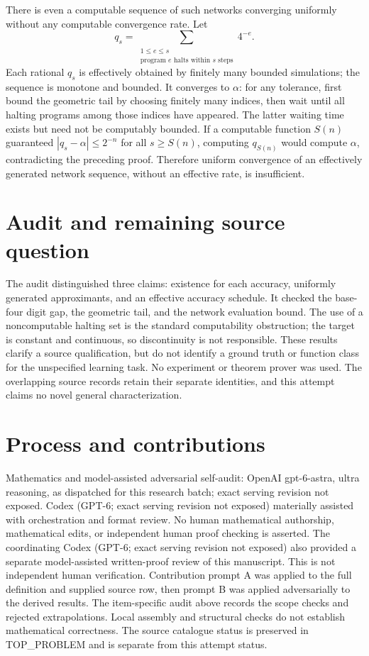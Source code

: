 \documentclass[11pt]{article}
\begin{document}
There is even a computable sequence of such networks converging
uniformly without any computable convergence rate. Let
\[
 q_s=\sum_{\substack{1\le e\le s\\
                 \text{program }e\text{ halts within }s\text{ steps}}}4^{-e}.
\]
Each rational $q_s$ is effectively obtained by finitely many
bounded simulations; the sequence is monotone and bounded.
It converges to $\alpha$: for any tolerance, first bound the
geometric tail by choosing finitely many indices, then wait
until all halting programs among those indices have appeared.
The latter waiting time exists but need not be computably
bounded. If a computable function $S(n)$ guaranteed
$|q_s-\alpha|\le2^{-n}$ for all $s\ge S(n)$, computing
$q_{S(n)}$ would compute $\alpha$, contradicting the preceding
proof. Therefore uniform convergence of an effectively generated
network sequence, without an effective rate, is insufficient.

\section{Audit and remaining source question}
The audit distinguished three claims: existence for each accuracy,
uniformly generated approximants, and an effective accuracy
schedule. It checked the base-four digit gap, the geometric tail,
and the network evaluation bound. The use of a noncomputable
halting set is the standard computability obstruction; the target
is constant and continuous, so discontinuity is not responsible.
These results clarify a source qualification, but do not identify
a ground truth or function class for the unspecified learning
task. No experiment or theorem prover was used. The overlapping
source records retain their separate identities, and this attempt
claims no novel general characterization.

\section{Process and contributions}
Mathematics and model-assisted adversarial self-audit: OpenAI gpt-6-astra, ultra reasoning, as dispatched for this research batch; exact serving revision not exposed. Codex (GPT-6; exact serving revision not exposed) materially assisted with orchestration and format review. No human mathematical authorship, mathematical edits, or independent human proof checking is asserted.
The coordinating Codex (GPT-6; exact serving revision not exposed) also provided a separate model-assisted written-proof review of this manuscript. This is not independent human verification.
Contribution prompt A was applied to the full definition and supplied source row, then prompt B was applied adversarially to the derived results. The item-specific audit above records the scope checks and rejected extrapolations. Local assembly and structural checks do not establish mathematical correctness. The source catalogue status is preserved in TOP\_PROBLEM and is separate from this attempt status.
\end{document}
